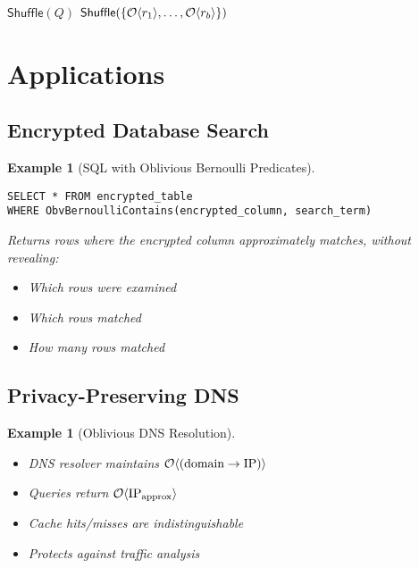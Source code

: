 \documentclass[11pt,final,hidelinks]{article}
\newtheorem{example}[theorem]{Example}
\begin{document}
\begin{algorithm}[H]
\caption{Batched Oblivious Queries}
$\mathsf{Shuffle}(Q)$ 
$\mathsf{Shuffle}(\{\mathcal{O}\langle r_1 \rangle, \ldots, \mathcal{O}\langle r_b \rangle\})$\;
\end{algorithm}

\section{Applications}

\subsection{Encrypted Database Search}

\begin{example}[SQL with Oblivious Bernoulli Predicates]
\begin{verbatim}
SELECT * FROM encrypted_table 
WHERE ObvBernoulliContains(encrypted_column, search_term)
\end{verbatim}
Returns rows where the encrypted column approximately matches, without revealing:
\begin{itemize}
    \item Which rows were examined
    \item Which rows matched
    \item How many rows matched
\end{itemize}
\end{example}

\subsection{Privacy-Preserving DNS}

\begin{example}[Oblivious DNS Resolution]
\begin{itemize}
    \item DNS resolver maintains $\mathcal{O}\langle (\text{domain} \to \text{IP}) \rangle$
    \item Queries return $\mathcal{O}\langle \text{IP}_{\text{approx}} \rangle$
    \item Cache hits/misses are indistinguishable
    \item Protects against traffic analysis
\end{itemize}
\end{example}
\end{document}
